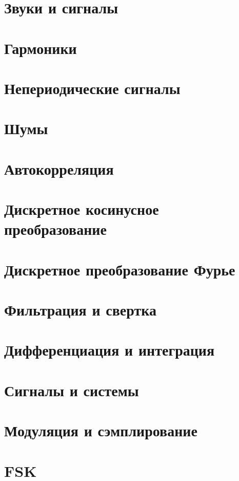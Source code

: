 \section{Звуки и сигналы}

\newpage

\section{Гармоники}

\newpage

\section{Непериодические сигналы}

\newpage

\section{Шумы}

\newpage

\section{Автокорреляция }

\newpage

\section{Дискретное косинусное преобразование }

\newpage

\section{Дискретное преобразование Фурье }

\newpage

\section{Фильтрация и свертка }

\newpage

\section{Дифференциация и интеграция }

\newpage

\section{Сигналы и системы }

\newpage

\section{Модуляция и сэмплирование }

\newpage

\section{FSK}
    
\newpage

